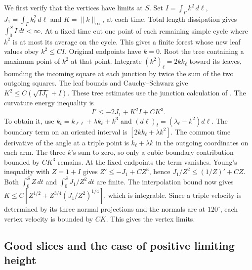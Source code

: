 We first verify that the vertices have limits at \(S\).
Set \(I=\int_\Gamma k^2\,d\ell\), \(J_1=\int_\Gamma k_\ell^2\,d\ell\)
and \(K=\|k\|_\infty\), at each time. Total length dissipation gives
\(\int_0^S I\,dt<\infty\). At a fixed time cut one point of each
remaining simple cycle where \(k^2\) is at most its average on the
cycle. This gives a finite forest whose new leaf values obey
\(k^2\le CI\). Original endpoints have \(k=0\). Root the tree containing
a maximum point of \(k^2\) at that point. Integrate
\((k^2)_\ell=2k k_\ell\) toward its leaves, bounding the incoming
square at each junction by twice the sum of the two outgoing squares.
The leaf bounds and Cauchy--Schwarz give \(K^2\le C(\sqrt{I J_1}+I)\).
These tree estimates use the junction calculation of \cite[\S4]{mnp}.
The curvature energy inequality is
\begin{equation}
 I'\le -2J_1+K^2 I+CK^3 .
 \label{eq:energy-early}
\end{equation}
To obtain it, use \(k_t=k_{\ell\ell}+\lambda k_\ell+k^3\) and
\((d\ell)_t=(\lambda_\ell-k^2)d\ell\). The boundary term on an
oriented interval is \([2k k_\ell+\lambda k^2]\).
The common time derivative of the angle at a triple point is
\(k_\ell+\lambda k\) in the outgoing coordinates on each arm.
The three \(k\)'s sum to zero, so only a cubic boundary contribution
bounded by \(CK^3\) remains. At the fixed endpoints the term vanishes.
Young's inequality with \(Z=1+I\) gives
\(Z'\le -J_1+CZ^3\), hence \(J_1/Z^2\le (1/Z)'+CZ\).
Both \(\int_0^S Z\,dt\) and \(\int_0^S J_1/Z^2\,dt\) are finite.
The interpolation bound now gives
\(K\le C[Z^{1/2}+Z^{3/4}(J_1/Z^2)^{1/4}]\), which is integrable.
Since a triple velocity is determined by its three normal projections
and the normals are at \(120^\circ\), each vertex velocity is bounded
by \(CK\). This gives the vertex limits.

\subsection{Good slices and the case of positive limiting height}
\label{sec:goodslices}

